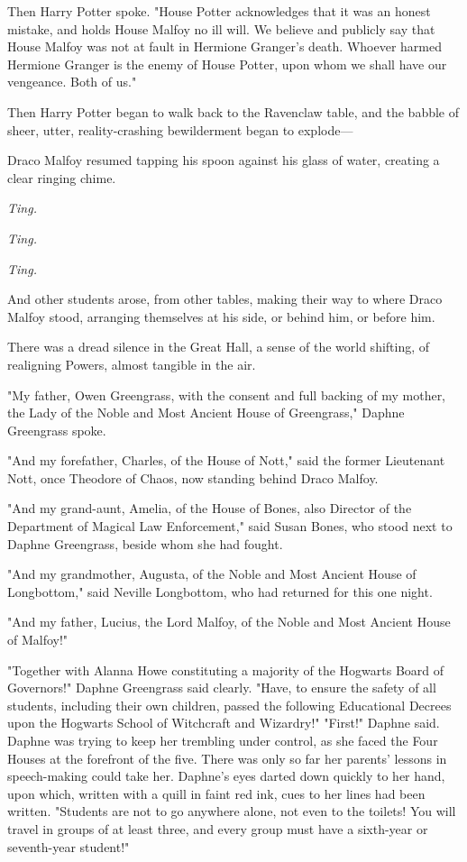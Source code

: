 Then Harry Potter spoke. "House Potter acknowledges that it was an honest
mistake, and holds House Malfoy no ill will. We believe and publicly say that
House Malfoy was not at fault in Hermione Granger's death. Whoever harmed
Hermione Granger is the enemy of House Potter, upon whom we shall have our
vengeance. Both of us."

Then Harry Potter began to walk back to the Ravenclaw table, and the babble of
sheer, utter, reality-crashing bewilderment began to explode\mbox{---}

Draco Malfoy resumed tapping his spoon against his glass of water, creating a clear
ringing chime.

\emph{Ting.}

\emph{Ting.}

\emph{Ting.}

And other students arose, from other tables, making their way to where Draco
Malfoy stood, arranging themselves at his side, or behind him, or before him.

There was a dread silence in the Great Hall, a sense of the world shifting, of
realigning Powers, almost tangible in the air.

"My father, Owen Greengrass, with the consent and full backing of my mother,
the Lady of the Noble and Most Ancient House of Greengrass," Daphne Greengrass
spoke.

"And my forefather, Charles, of the House of Nott," said the former Lieutenant
Nott, once Theodore of Chaos, now standing behind Draco Malfoy.

"And my grand-aunt, Amelia, of the House of Bones, also Director of the
Department of Magical Law Enforcement," said Susan Bones, who stood next to
Daphne Greengrass, beside whom she had fought.

"And my grandmother, Augusta, of the Noble and Most Ancient House of
Longbottom," said Neville Longbottom, who had returned for this one night.

"And my father, Lucius, the Lord Malfoy, of the Noble and Most Ancient House of
Malfoy!"

"Together with Alanna Howe constituting a majority of the Hogwarts Board of
Governors!" Daphne Greengrass said clearly. "Have, to ensure the safety of all
students, including their own children, passed the following Educational
Decrees upon the Hogwarts School of Witchcraft and Wizardry!"
\sbreak
"First!" Daphne said. Daphne was trying to keep her trembling under control, as
she faced the Four Houses at the forefront of the five. There was only so far
her parents' lessons in speech-making could take her. Daphne's eyes darted down
quickly to her hand, upon which, written with a quill in faint red ink, cues to
her lines had been written. "Students are not to go anywhere alone, not even to
the toilets! You will travel in groups of at least three, and every group must
have a sixth-year or seventh-year student!"

